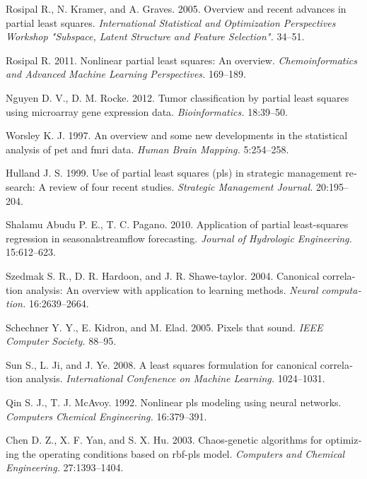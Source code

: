 \documentclass[12pt]{article}
\begin{document}
\begin{otherlanguage}{english}

\begin{thebibliography}{99}


Rosipal R., N. Kramer, and A. Graves. 2005. Overview and recent advances in partial least squares. \textit{International Statistical and Optimization Perspectives Workshop "Subspace, Latent Structure and Feature Selection".} 34--51.

Rosipal R. 2011. Nonlinear partial least squares: An overview. \textit{Chemoinformatics and Advanced Machine Learning Perspectives.} 169--189.

Nguyen D. V., D. M. Rocke. 2012. Tumor classification by partial least squares using microarray gene expression data. \textit{Bioinformatics.} 18:39--50. 

Worsley K. J. 1997. An overview and some new developments in the statistical analysis of pet and fmri data. \textit{Human Brain Mapping.} 5:254--258.

Hulland J. S. 1999. Use of partial least squares (pls) in strategic management research: A review of four recent studies. \textit{Strategic Management Journal.} 20:195--204.

Shalamu Abudu P. E., T. C. Pagano. 2010. Application of partial least-squares regression in seasonalstreamflow forecasting. \textit{Journal of Hydrologic Engineering.} 15:612--623.

Szedmak S. R., D. R. Hardoon, and J. R. Shawe-taylor. 2004. Canonical correlation analysis: An overview with application to learning methods. \textit{Neural computation.} 16:2639--2664.

Schechner Y. Y., E. Kidron, and M. Elad. 2005. Pixels that sound. \textit{IEEE Computer Society.} 88--95.

Sun S., L. Ji, and J. Ye. 2008. A least squares formulation for canonical correlation analysis. \textit{International Confenence on Machine Learning.} 1024--1031.

Qin S. J., T. J. McAvoy. 1992. Nonlinear pls modeling using neural networks. \textit{Computers Chemical Engineering.} 16:379--391.

Chen D. Z., X. F. Yan, and S. X. Hu. 2003. Chaos-genetic algorithms for optimizing the operating conditions based on rbf-pls model. \textit{Computers and Chemical Engineering.} 27:1393--1404.


\end{thebibliography}
\end{otherlanguage}
\end{document}
